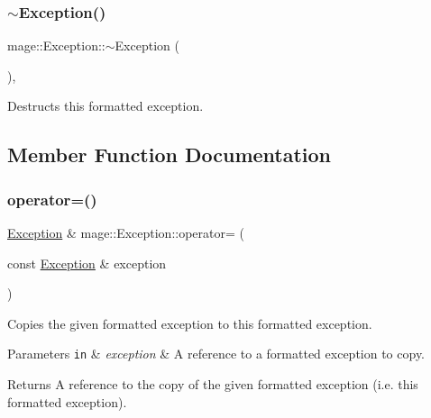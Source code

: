 \subsubsection{\texorpdfstring{$\sim$\+Exception()}{~Exception()}}
{\footnotesize\ttfamily mage\+::\+Exception\+::$\sim$\+Exception (\begin{DoxyParamCaption}{ }\end{DoxyParamCaption})\hspace{0.3cm}{\ttfamily [virtual]}, {\ttfamily [default]}}

Destructs this formatted exception. 

\subsection{Member Function Documentation}
\mbox{\label{classmage_1_1_exception_ab0e7e6b32b07505271a4a88067ab54f4}} 
\subsubsection{\texorpdfstring{operator=()}{operator=()}\hspace{0.1cm}{\footnotesize\ttfamily [1/2]}}
{\footnotesize\ttfamily \mbox{\hyperlink{classmage_1_1_exception}{Exception}} \& mage\+::\+Exception\+::operator= (\begin{DoxyParamCaption}\item[{const \mbox{\hyperlink{classmage_1_1_exception}{Exception}} \&}]{exception }\end{DoxyParamCaption})\hspace{0.3cm}{\ttfamily [default]}}

Copies the given formatted exception to this formatted exception.


\begin{DoxyParams}[1]{Parameters}
\mbox{\tt in}  & {\em exception} & A reference to a formatted exception to copy. \\
\hline
\end{DoxyParams}
\begin{DoxyReturn}{Returns}
A reference to the copy of the given formatted exception (i.\+e. this formatted exception). 
\end{DoxyReturn}
\mbox{\label{classmage_1_1_exception_aa9305c6bd8836f56ffa970473533f031}} 
